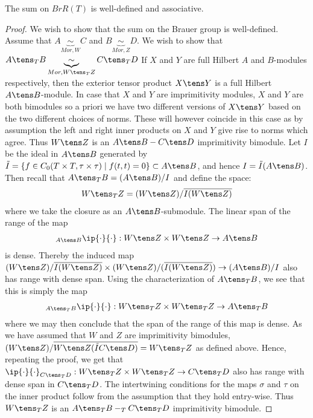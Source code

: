 \begin{lemma}
	The sum on $BrR(T)$ is well-defined and associative. 
\end{lemma}
\begin{proof}
We wish to show that the sum on the Brauer group is well-defined. Assume that $A\underbrace{\sim}_{Mor,W} C$ and $B\underbrace{\sim}_{Mor,Z} D$. We wish to show that $A\tens_T B\underbrace{\sim}_{Mor,W\tens_T Z} C\tens_T D$
If $X$ and $Y$ are full Hilbert $A$ and $B$-modules respectively, then the exterior tensor product $X\tens Y$ is a full Hilbert $A\tens B$-module. In case that $X$ and $Y$ are imprimitivity modules, $X$ and $Y$ are both bimodules so a priori we have two different versions of $X\tens Y$ based on the two different choices of norms. These will however coincide in this case as by assumption the left and right inner products on $X$ and $Y$ give rise to norms which agree. 
Thus $W\tens Z$ is an $A\tens B-C\tens D$ imprimitivity bimodule. Let $I$ be the ideal in $A\tens B$ generated by $\tilde{I}=\{f\in C_0(T\times T,\tau \times \tau) \mid f(t,t)=0\}\subset A\tens B$, and hence $I=\tilde{I}(A\tens B)$. Then recall that $A\tens_T B=(A\tens B)/I$ and define the space: 
\begin{align*}
	W\tens_T Z=(W\tens Z)/\overline{I(W\tens Z)} 
\end{align*}
where we take the closure as an $A\tens B$-submodule. The linear span of the range of the map \begin{align*} {}_{A\tens B}\ip{\cdot}{\cdot}:W\tens Z\times W\tens Z\to A\tens B \end{align*} is dense. Thereby the induced map $(W\tens Z)/\overline{I(W\tens Z)}\times (W\tens Z)/(\overline{I(W\tens Z)}) \to (A\tens B)/I$ also has range with dense span. Using the characterization of $A\tens_T B$, we see that this is simply the map
\begin{align*} 
	{}_{A\tens_T B} \ip{\cdot}{\cdot}:W\tens_T Z\times W\tens_T Z\to A\tens_T B
\end{align*}
where we may then conclude that the span of the range of this map is dense.
As we have assumed that $W$ and $Z$ are imprimitivity bimodules, $(W\tens Z)/\overline{W\tens Z(\tilde{I}C\tens D)}=W\tens_T Z$ as defined above. Hence, repeating the proof, we get that $\ip{\cdot}{\cdot }_{C\tens_T D}: W\tens_T Z\times W\tens_T Z\to C\tens_T D$ also has range with dense span in $C\tens_T D$. The intertwining conditions for the maps $\sigma$ and $\tau$ on the inner product follow from the assumption that they hold entry-wise. Thus $W\tens_T Z$ is an $A\tens_T B-_T C\tens_T D$ imprimitivity bimodule. 


\end{proof}
